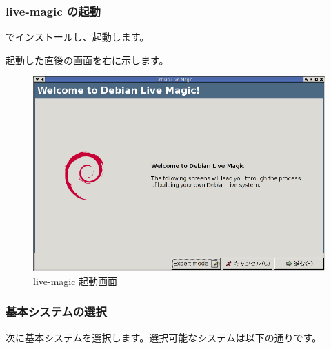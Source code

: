 \documentclass[mingoth,a4paper]{jsarticle}
\begin{document}
\subsubsection{live-magic の起動}

\begin{commandline}
\end{commandline}
でインストールし、起動します。

\begin{multicols}{2}
 起動した直後の画面を右に示します。

 \begin{figure}[H]
 \begin{center}
  \includegraphics[width=1\hsize]{image200711/live-magic00.png}
 \end{center}
 \caption{live-magic 起動画面}
 \label{live-magic00}
 \end{figure}
\end{multicols}


\subsubsection{基本システムの選択}
次に基本システムを選択します。選択可能なシステムは以下の通りです。
\end{document}
